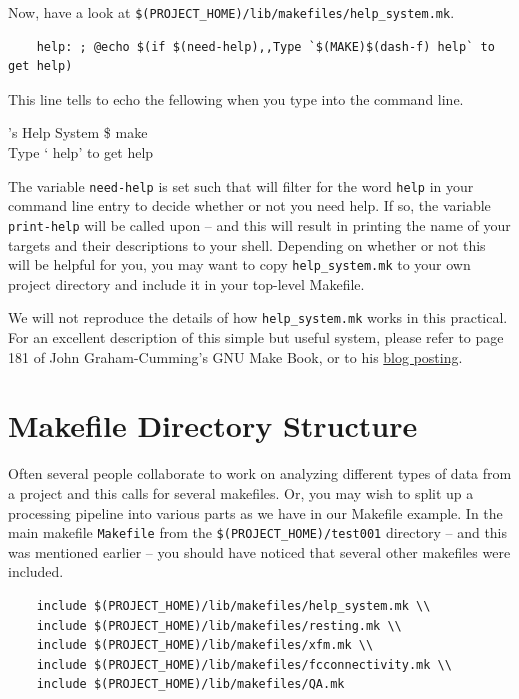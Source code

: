 Now, have a look at \texttt{\$(PROJECT_HOME)/lib/makefiles/help_system.mk}.
\begin{lstlisting}
	help: ; @echo $(if $(need-help),,Type `$(MAKE)$(dash-f) help` to get help)
\end{lstlisting}

This line tells \maken{} to echo the fellowing when you type \maken{} into the command line.
\begin{bash}{\maken{}'s Help System}{}
\$ make \\
Type `\maken{} help' to get help
\end{bash}

The variable \texttt{need-help} is set such that \maken{} will filter for the word \texttt{help} in your command line entry to decide whether or not you need help. If so, the variable \texttt{print-help} will be called upon -- and this will result in \maken{} printing the name of your targets and their descriptions to your shell. Depending on whether or not this will be helpful for you, you may want to copy \texttt{help_system.mk} to your own project directory and include it in your top-level Makefile. 

We will not reproduce the details of how \texttt{help_system.mk} works in this practical. For an excellent description of this simple but useful system, please refer to page 181 of John Graham-Cumming's GNU Make Book, or to his \href{http://www.cmcrossroads.com/article/self-documenting-makefiles}{blog posting}.  

\section{Makefile Directory Structure}
Often several people collaborate to work on analyzing different types of data from a project and this calls for several makefiles. Or, you may wish to split up a processing pipeline into various parts as we have in our Makefile example. In the main makefile \texttt{Makefile} from the \texttt{\$(PROJECT_HOME)/test001} directory -- and this was mentioned earlier -- you should have noticed that several other makefiles were included. 

\begin{lstlisting}
	include $(PROJECT_HOME)/lib/makefiles/help_system.mk \\
	include $(PROJECT_HOME)/lib/makefiles/resting.mk \\
	include $(PROJECT_HOME)/lib/makefiles/xfm.mk \\
	include $(PROJECT_HOME)/lib/makefiles/fcconnectivity.mk \\
	include $(PROJECT_HOME)/lib/makefiles/QA.mk 
\end{lstlisting}

